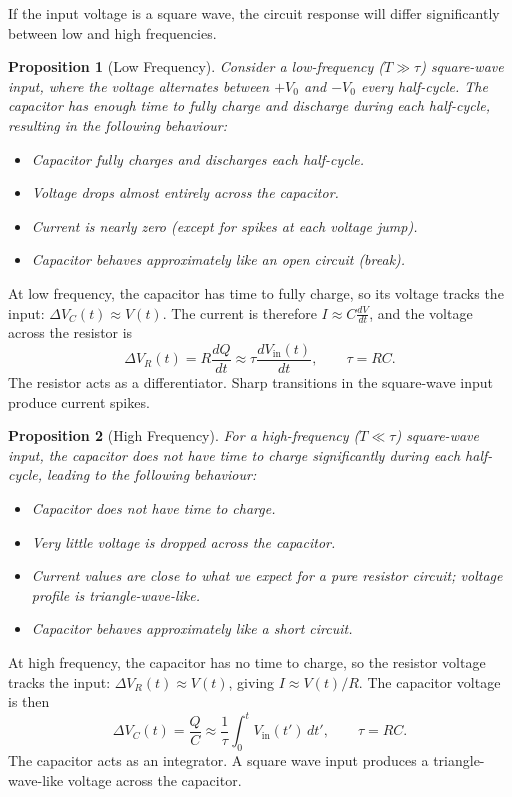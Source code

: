 \documentclass{article}
\newtheorem{proposition}{Proposition}
\begin{document}
If the input voltage is a square wave, the circuit response will differ significantly between low and high frequencies.
\begin{proposition}[Low Frequency]
    Consider a low-frequency ($T \gg \tau$) square-wave input, where the voltage alternates between $+V_0$ and $-V_0$ every half-cycle. The capacitor has enough time to fully charge and discharge during each half-cycle, resulting in the following behaviour:
    \begin{itemize}
        \item Capacitor fully charges and discharges each half-cycle.
        \item Voltage drops almost entirely across the capacitor.
        \item Current is nearly zero (except for spikes at each voltage jump).
        \item Capacitor behaves approximately like an open circuit (break).
    \end{itemize}
\end{proposition}
At low frequency, the capacitor has time to fully charge, so its voltage tracks the input: $\Delta V_C(t) \approx V(t)$. The current is therefore $I \approx C\frac{dV}{dt}$, and the voltage across the resistor is
\[\Delta V_R(t) = R\frac{dQ}{dt} \approx \tau\frac{dV_{\text{in}}(t)}{dt}, \qquad \tau = RC.\]
The resistor acts as a differentiator. Sharp transitions in the square-wave input produce current spikes.
\begin{proposition}[High Frequency]
    For a high-frequency ($T \ll \tau$) square-wave input, the capacitor does not have time to charge significantly during each half-cycle, leading to the following behaviour:
    \begin{itemize}
        \item Capacitor does not have time to charge.
        \item Very little voltage is dropped across the capacitor.
        \item Current values are close to what we expect for a pure resistor circuit; voltage profile is triangle-wave-like.
        \item Capacitor behaves approximately like a short circuit.
    \end{itemize}
\end{proposition}
At high frequency, the capacitor has no time to charge, so the resistor voltage tracks the input: $\Delta V_R(t) \approx V(t)$, giving $I \approx V(t)/R$. The capacitor voltage is then
\[\Delta V_C(t) = \frac{Q}{C} \approx \frac{1}{\tau}\int_0^t V_{\text{in}}(t')\,dt', \qquad \tau = RC.\]
The capacitor acts as an integrator. A square wave input produces a triangle-wave-like voltage across the capacitor.
\end{document}
